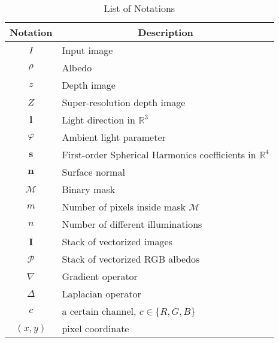 \begin{table}[ht]
\centering
\caption{List of Notations}
\vspace{0.1cm}
\bgroup
\def\arraystretch{1.4}%
\begin{tabular}{|c|l|}
\hline
Notation & \multicolumn{1}{c|}{Description} \\ \hline \hline
$I$           & Input image                      \\ \hline
$\rho$      & Albedo                                 \\ \hline
$z$      & Depth image                                 \\ \hline
$Z$      & Super-resolution depth image                                 \\ \hline
$\mathbf{l}$      & Light direction in $\mathbb{R}^3$                                 \\ \hline
$\varphi$      & Ambient light parameter                                 \\ \hline
$\mathbf{s}$      & First-order Spherical Harmonics coefficients in $\mathbb{R}^4$                                 \\ \hline
$\mathbf{n}$         & Surface normal                               \\ \hline
$\mathcal{M}$         & Binary mask                                 \\ \hline
$m$        & Number of pixels inside mask $\mathcal{M}$                                 \\ \hline
$n$         & Number of different illuminations                                 \\ \hline
$\mathbf{I}$         &  Stack of vectorized images                                \\ \hline
$\mathcal{P}$         & Stack of vectorized RGB albedos                                  \\ \hline
$\nabla$         & Gradient operator                                  \\ \hline
$\Delta$         & Laplacian operator                                  \\ \hline
$c$         & a certain channel, $c \in\{R,G,B\}$                                  \\ \hline
$(x,y)$   & pixel coordinate\\ \hline
\end{tabular}
\egroup
\end{table}

